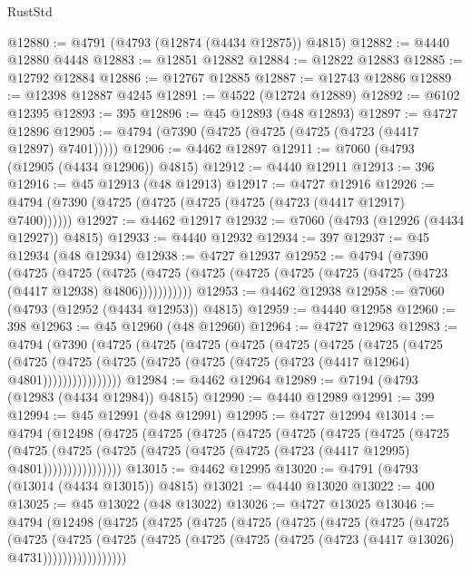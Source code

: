 \begin{lexlean}{RustStd}
\begin{coremodule}
{\begin{coremodule}
{{{{{{{{{{{{{{{{{{{{{{{{{{{{{{{{{{{{{{{{{{{{{{{{{{{{{{{{{{{{@12880 := @4791 (@4793 (@12874 (@4434 @12875)) @4815)
@12882 := @4440 @12880 @4448
@12883 := @12851 @12882
@12884 := @12822 @12883
@12885 := @12792 @12884
@12886 := @12767 @12885
@12887 := @12743 @12886
@12889 := @12398 @12887 @4245
@12891 := @4522 (@12724 @12889)
@12892 := @6102 @12395
@12893 := 395
@12896 := @45 @12893 (@48 @12893)
@12897 := @4727 @12896
@12905 := @4794 (@7390 (@4725 (@4725 (@4725 (@4723 (@4417 @12897) @7401)))))
@12906 := @4462 @12897
@12911 := @7060 (@4793 (@12905 (@4434 @12906)) @4815)
@12912 := @4440 @12911
@12913 := 396
@12916 := @45 @12913 (@48 @12913)
@12917 := @4727 @12916
@12926 := @4794 (@7390 (@4725 (@4725 (@4725 (@4725 (@4723 (@4417 @12917) @7400))))))
@12927 := @4462 @12917
@12932 := @7060 (@4793 (@12926 (@4434 @12927)) @4815)
@12933 := @4440 @12932
@12934 := 397
@12937 := @45 @12934 (@48 @12934)
@12938 := @4727 @12937
@12952 := @4794
    (@7390
      (@4725
        (@4725
          (@4725 (@4725 (@4725 (@4725 (@4725 (@4725 (@4725 (@4723 (@4417 @12938) @4806)))))))))))
@12953 := @4462 @12938
@12958 := @7060 (@4793 (@12952 (@4434 @12953)) @4815)
@12959 := @4440 @12958
@12960 := 398
@12963 := @45 @12960 (@48 @12960)
@12964 := @4727 @12963
@12983 := @4794
    (@7390
      (@4725
        (@4725
          (@4725
            (@4725
              (@4725
                (@4725
                  (@4725
                    (@4725
                      (@4725
                        (@4725
                          (@4725 (@4725 (@4725 (@4725 (@4723 (@4417 @12964) @4801))))))))))))))))
@12984 := @4462 @12964
@12989 := @7194 (@4793 (@12983 (@4434 @12984)) @4815)
@12990 := @4440 @12989
@12991 := 399
@12994 := @45 @12991 (@48 @12991)
@12995 := @4727 @12994
@13014 := @4794
    (@12498
      (@4725
        (@4725
          (@4725
            (@4725
              (@4725
                (@4725
                  (@4725
                    (@4725
                      (@4725
                        (@4725
                          (@4725 (@4725 (@4725 (@4725 (@4723 (@4417 @12995) @4801))))))))))))))))
@13015 := @4462 @12995
@13020 := @4791 (@4793 (@13014 (@4434 @13015)) @4815)
@13021 := @4440 @13020
@13022 := 400
@13025 := @45 @13022 (@48 @13022)
@13026 := @4727 @13025
@13046 := @4794
    (@12498
      (@4725
        (@4725
          (@4725
            (@4725
              (@4725
                (@4725
                  (@4725
                    (@4725
                      (@4725
                        (@4725
                          (@4725
                            (@4725 (@4725 (@4725 (@4725 (@4723 (@4417 @13026) @4731)))))))))))))))))
}}}}}}}}}}}}}}}}}}}}}}}}}}}}}}}}}}}}}}}}}}}}}}}}}}}}}}}}}}}}
\end{coremodule}}
\end{coremodule}
\end{lexlean}
